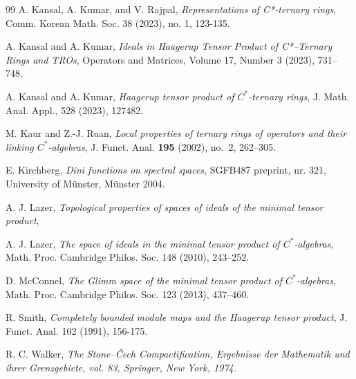 \documentclass{birkjour}
\theoremstyle{definition}
\theoremstyle{remark}
\numberwithin{equation}{section}
\begin{document}
\begin{thebibliography}{99}
{\sc A. Kansal, A. Kumar,  and V. Rajpal}, 
{\it Representations of C*-ternary rings}, 
Comm. Korean Math. Soc. 38 (2023), no. 1, 123-135. 

{\sc A. Kansal and A. Kumar}, 
{\it Ideals in Haagerup Tensor Product of C*–Ternary Rings and TROs}, 
Operators and Matrices, Volume 17, Number 3 (2023), 731–748.

{\sc A. Kansal and A. Kumar}, 
{\it Haagerup tensor product of $C^{\ast}$-ternary rings}, 
J. Math. Anal. Appl., 528 (2023), 127482.

{\sc M. Kaur and Z.-J. Ruan}, 
{\it Local properties of ternary rings of operators and their linking $C^*$-algebras}, 
J. Funct. Anal. {\bf 195} (2002), no.~2, 262--305.


{\sc E. Kirchberg}, {\it Dini functions on spectral spaces}, SGFB487 preprint, nr. 321, University of M\"unster, M\"unster 2004.





 {\sc A. J. Lazer}, 
{\it Topological properties of spaces of ideals of the minimal tensor product}, 

{\sc A. J. Lazer}, 
{\it The space of ideals in the minimal tensor product of $C^*$-algebras}, 
Math. Proc. Cambridge Philos. Soc. 148 (2010), 243–252.





{\sc D. McConnel}, 
{\it The Glimm space of the minimal tensor product of $C^*$-algebras}, 
Math. Proc. Cambridge Philos. Soc. 123 (2013), 437–460.

{\sc R. Smith}, 
{\it Completely bounded module maps and the Haagerup tensor product}, 
J. Funct. Anal. 102 (1991), 156-175.


{\sc R. C. Walker},
\it{The Stone--Čech Compactification}, Ergebnisse der Mathematik und ihrer Grenzgebiete, vol. 83, Springer, New York, 1974.



\end{thebibliography}

\end{document}
